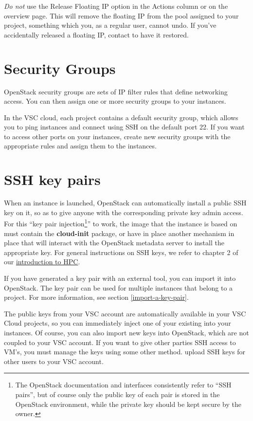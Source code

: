  \emph{Do not} use the Release Floating IP option in
the Actions column or on the overview page.  This will remove the
floating IP from the pool assigned to your project, something which
you, as a regular user, cannot undo.  If you've accidentally released
a floating IP, contact \cloudinfo to have it restored.

\section{Security Groups}\label{sec:security-groups}
OpenStack security groups are sets of IP filter rules that define
networking access.  You can then assign one or more security groups to
your instances.

In the VSC cloud, each project contains a default security group,
which allows you to ping instances and connect using SSH on the
default port 22.  If you want to access other ports on your instances,
create new security groups with the appropriate rules and assign them
to the instances.

\section{SSH key pairs}\label{sec:ssh-key-pairs}
When an instance is launched, OpenStack can automatically install a
public SSH key on it, so as to give anyone with the corresponding
private key admin access.  For this ``key pair injection\footnote{The
  OpenStack documentation and interfaces consistently refer to ``SSH
  pairs'', but of course only the public key of each pair is stored in
  the OpenStack environment, while the private key should be kept
  secure by the owner.}'' to work, the image that the instance is
based on must contain the \textbf{cloud-init} package, or have in
place another mechanism in place that will interact with the OpenStack
metadata server to install the appropriate key.  For general
instructions on SSH keys, we refer to chapter 2 of our
\href{https://hpcugent.github.io/vsc\_user\_docs}{introduction to
  HPC}.

If you have generated a key pair with an external tool, you can import
it into OpenStack. The key pair can be used for multiple instances
that belong to a project. For more information, see section
\ref{import-a-key-pair}.

 The public keys from your VSC account are automatically
available in your VSC Cloud projects, so you can immediately inject
one of your existing into your instances.  Of course, you can also
import new keys into OpenStack, which are not coupled to your VSC
account.  If you want to give other parties SSH access to VM's, you
must manage the keys using some other method.   upload
SSH keys for other users to your VSC account.

